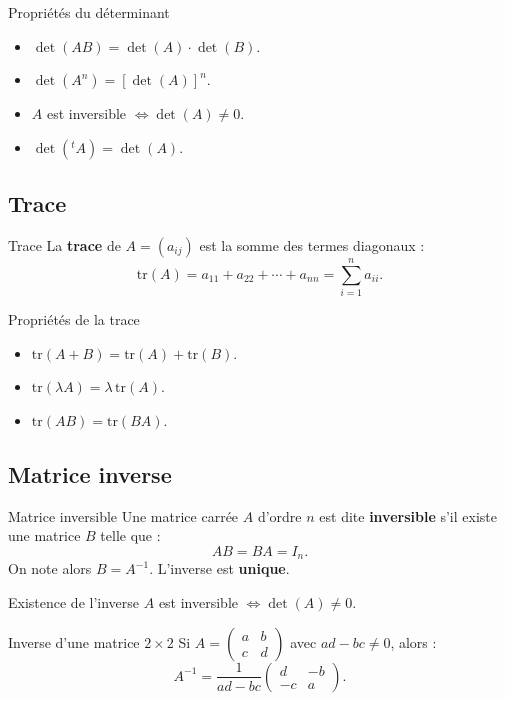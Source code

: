 \begin{propriete}{Propriétés du déterminant}
	\begin{itemize}
		\item $\det(AB) = \det(A)\cdot\det(B)$.
		\item $\det(A^n) = [\det(A)]^n$.
		\item $A$ est inversible $\iff \det(A) \neq 0$.
		\item $\det({}^tA) = \det(A)$.
	\end{itemize}
\end{propriete}

\subsection{Trace}

\begin{definition}{Trace}
	La \textbf{trace} de $A=(a_{ij})$ est la somme des termes diagonaux :
	\[
	\mathrm{tr}(A) = a_{11} + a_{22} + \cdots + a_{nn} = \sum_{i=1}^n a_{ii}.
	\]
\end{definition}

\begin{propriete}{Propriétés de la trace}
	\begin{itemize}
		\item $\mathrm{tr}(A+B) = \mathrm{tr}(A)+\mathrm{tr}(B)$.
		\item $\mathrm{tr}(\lambda A) = \lambda\,\mathrm{tr}(A)$.
		\item $\mathrm{tr}(AB) = \mathrm{tr}(BA)$.
	\end{itemize}
\end{propriete}

\subsection{Matrice inverse}

\begin{definition}{Matrice inversible}
	Une matrice carrée $A$ d'ordre $n$ est dite \textbf{inversible} s'il existe
	une matrice $B$ telle que :
	\[
	AB = BA = I_n.
	\]
	On note alors $B = A^{-1}$. L'inverse est \textbf{unique}.
\end{definition}

\begin{theoreme}{Existence de l'inverse}
	$A$ est inversible $\iff \det(A) \neq 0$.
\end{theoreme}

\begin{methode}{Inverse d'une matrice $2\times 2$}
	Si $A=\begin{pmatrix}a&b\\c&d\end{pmatrix}$ avec $ad-bc\neq 0$, alors :
	\[
	A^{-1} = \frac{1}{ad-bc}\begin{pmatrix}d&-b\\-c&a\end{pmatrix}.
	\]
\end{methode}

